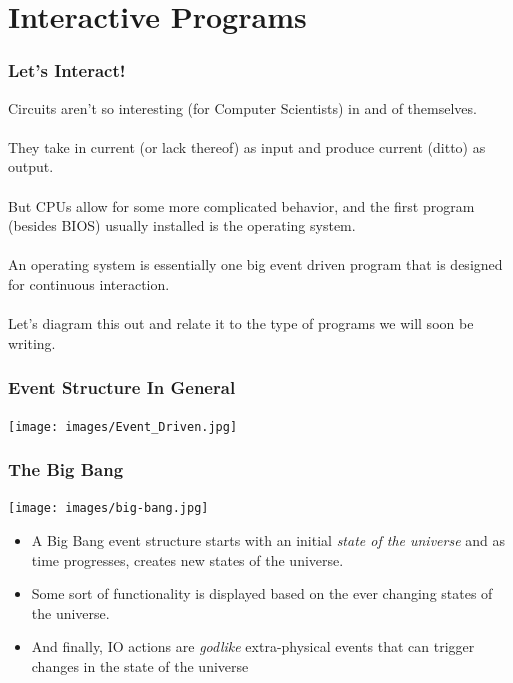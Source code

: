 \documentclass{beamer}
\begin{document}
\section{Interactive Programs}
\begin{frame}
  \frametitle{Let's Interact!}
  Circuits aren't so interesting (for Computer Scientists) in and of themselves.
  \\\\
  \pause
  They take in current (or lack thereof) as input and produce current (ditto) as output.
  \\\\
  \pause
  But CPUs allow for some more complicated behavior, and the first program (besides BIOS) usually installed is the operating system.
  \\\\
  \pause
  An operating system is essentially one big event driven program that is
  designed for continuous interaction.
  \\\\
  \pause
  Let's diagram this out and relate it to the type of programs we will soon
  be writing.
\end{frame}

\begin{frame}
  \frametitle{Event Structure In General}
  \begin{center}
    \texttt{[image: images/Event\_Driven.jpg]}
  \end{center}
\end{frame}

\begin{frame}
  \frametitle{The Big Bang}
  \begin{center}
    \texttt{[image: images/big-bang.jpg]}
  \end{center}
  \begin{itemize}
  \item<2->A Big Bang event structure starts with an initial \emph{state of the universe}
  and as time progresses, creates new states of the universe.
  
  \item<3-> Some sort of functionality is displayed based on the ever changing states of the
  universe.
  
\item<4-> And finally, IO actions are \emph{godlike} extra-physical events that can trigger  changes in the state of the universe
  \end{itemize}
\end{frame}
\end{document}
